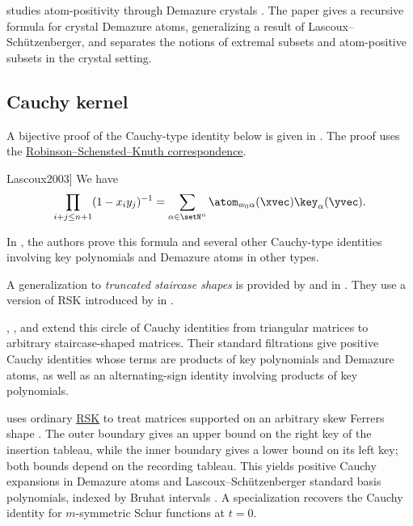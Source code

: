  studies atom-positivity through Demazure crystals
\cite{Armon2023x}.  The paper gives a recursive formula for crystal
Demazure atoms, generalizing a result of Lascoux--Schützenberger, and
separates the notions of extremal subsets and atom-positive subsets in the
crystal setting.


\subsection[atomCauchyKernel]{Cauchy kernel}

A bijective proof of the Cauchy-type identity below is given in
\cite[Thm.~6]{Lascoux2003}.
The proof uses the \hyperref[rsk]{Robinson--Schensted--Knuth correspondence}.

\begin{theorem}[See \cite[Thm.~6]{Lascoux2003}]
We have
\[
\prod_{i+j \leq n+1} (1-x_iy_j)^{-1} =
\sum_{\alpha \in \setN^n} \atom_{w_0\alpha}(\xvec) \key_{\alpha}(\yvec).
\]
\end{theorem}

In \cite{FuLascoux2009}, the authors prove this formula and several other Cauchy-type
identities involving key polynomials and Demazure atoms in other types.

A generalization to \emph{truncated staircase shapes} is provided
by  and  in \cite{AzenhasEmami2015}.
They use a version of RSK introduced by  in \cite{Mason2008}.

, , and
 \cite{FeiginKhoroshkinMakedonskyi2024x}
extend this circle of Cauchy identities from triangular matrices to arbitrary
staircase-shaped matrices.  Their standard filtrations give positive Cauchy
identities whose terms are products of key polynomials and Demazure atoms, as
well as an alternating-sign identity involving products of key polynomials.

 uses ordinary \hyperref[rsk]{RSK} to treat matrices
supported on an arbitrary skew Ferrers shape \cite{Pena2026x}.  The outer
boundary gives an upper bound on the right key of the insertion tableau,
while the inner boundary gives a lower bound on its left key; both bounds
depend on the recording tableau.  This yields positive Cauchy expansions in
Demazure atoms and Lascoux--Schützenberger standard basis polynomials, indexed
by Bruhat intervals \cite[Thm.~25 and Cor.~50]{Pena2026x}.  A specialization
recovers the Cauchy identity for \(m\)-symmetric Schur functions at \(t=0\).

